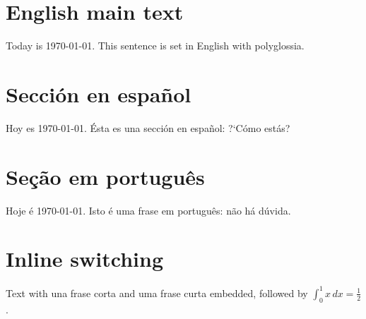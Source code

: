 \documentclass[11pt]{article}
\begin{document}
\tableofcontents
\section{English main text}
Today is \today. This sentence is set in English with polyglossia.

\section{Secci\'on en espa\~nol}
\begin{spanish}
Hoy es \today. \'Esta es una secci\'on en espa\~nol: ?`C\'omo est\'as?
\end{spanish}

\section{Se\c{c}\~ao em portugu\^es}
\begin{portuguese}
Hoje \'e \today. Isto \'e uma frase em portugu\^es: n\~ao h\'a d\'uvida.
\end{portuguese}

\section{Inline switching}
Text with \textspanish{una frase corta} and \textportuguese{uma frase curta}
embedded, followed by $\int_0^1 x\,dx=\tfrac12$.
\end{document}
